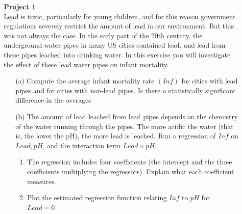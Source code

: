 \documentclass{uofa-eng-assignment}
\begin{document}
 \maketitle
\begin{enumerate}
    \item[]
        \textbf{Project 1} \\
        Lead is toxic, particularly for young children, and for this reason government regulations
        severely restrict the amount of lead in our environment. But this was not always the
        case. In the early part of the 20th century, the underground water pipes in many US
        cities contained lead, and lead from these pipes leached into drinking water. In this
        exercise you will investigate the effect of these lead water pipes on infant mortality.
        \begin{enumerate}
            \item[(a)] Compute the average infant mortality rate $(Inf)$ for cities with lead pipes and for
                cities with non-lead pipes. Is there a statistically significant difference in the averages
            \item[(b)] The amount of lead leached from lead pipes depends on the chemistry of the
                water running through the pipes. The more acidic the water (that is, the lower
                the pH), the more lead is leached. Run a regression of $Inf$ on $Lead, pH$, and the
                interaction term $Lead \times pH$.
                \begin{enumerate}
                    \item The regression includes four coefficients (the intercept and the three
                          coefficients multiplying the regressors). Explain what each coefficient
                          measures.
                    \item Plot the estimated regression function relating $Inf$ to $pH$ for $Lead = 0$

\end{enumerate}
\end{enumerate}
\end{enumerate}
\end{document}
